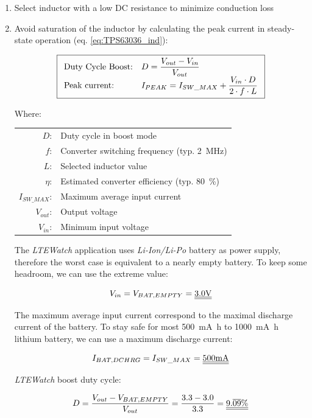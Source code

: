 \documentclass[report.tex]{subfiles}
\begin{document}
\begin{enumerate}
\item Select inductor with a low DC resistance to minimize conduction loss
\item Avoid saturation of the inductor by calculating the peak current in steady-state operation (eq. \ref{eq:TPS63036_ind}):

\begin{equation}
\label{eq:TPS63036_ind}
\boxed{\begin{array}{l l}
\text{Duty Cycle Boost:} & D = \dfrac{V_{out}-V_{in}}{V_{out}} \\
\text{Peak current:} & I_{PEAK} = I_{SW\_MAX} + \dfrac{V_{in} \cdot D}{2 \cdot f \cdot L}
\end{array}}
\end{equation}

Where:

\begin{center}
\begin{tabular}{r l}
$D$: & Duty cycle in boost mode\\
$f$: & Converter switching frequency (typ. \SI{2}{\mega\hertz})\\
$L$: & Selected inductor value\\
$\eta$: & Estimated converter efficiency (typ. \SI{80}{\percent})\\
$I_{SW\_MAX}$: & Maximum average input current\\
$V_{out}$: & Output voltage\\
$V_{in}$: & Minimum input voltage\\
\end{tabular}
\end{center}

The \textit{LTEWatch} application uses \textit{Li-Ion/Li-Po} battery as power supply, therefore the worst case is equivalent to a nearly empty battery. To keep some headroom, we can use the extreme value: 

$$ V_{in} = V_{BAT,EMPTY} = \underline{\underline{3.0\si{\volt}}} $$

The maximum average input current correspond to the maximal discharge current of the battery. To stay safe for most \SI{500}{\milli\ampere\hour} to \SI{1000}{\milli\ampere\hour} lithium battery, we can use a maximum discharge current:

$$ I_{BAT,DCHRG}= I_{SW\_MAX} = \underline{\underline{500\si{\milli\ampere}}}$$

\textit{LTEWatch} boost duty cycle:

$$
D = \dfrac{V_{out}-V_{BAT,EMPTY}}{V_{out}} = \dfrac{3.3-3.0}{3.3} = \underline{\underline{9.\overline{09}\si{\percent}}} 
$$


\end{enumerate}
\end{document}
